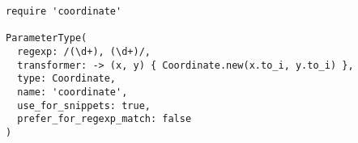 \begin{verbatim}
require 'coordinate'

ParameterType(
  regexp: /(\d+), (\d+)/,
  transformer: -> (x, y) { Coordinate.new(x.to_i, y.to_i) },
  type: Coordinate,
  name: 'coordinate',
  use_for_snippets: true,
  prefer_for_regexp_match: false
)
\end{verbatim}